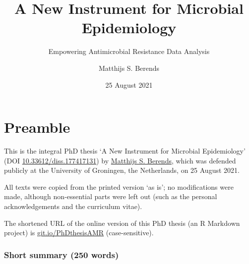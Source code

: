 \documentclass[
]{book}
\title{A New Instrument for Microbial Epidemiology}
\subtitle{Empowering Antimicrobial Resistance Data Analysis}
\author{Matthijs S. Berends}
\date{25 August 2021}
\begin{document}
\maketitle

{
\setcounter{tocdepth}{1}
\tableofcontents
}
\hypertarget{preamble}{%
\chapter*{Preamble}\label{preamble}}

This is the integral PhD thesis `A New Instrument for Microbial Epidemiology' (DOI \href{https://doi.org/10.33612/diss.177417131}{10.33612/diss.177417131}) by \href{https://www.rug.nl/staff/m.s.berends}{Matthijs S. Berends}, which was defended publicly at the University of Groningen, the Netherlands, on 25 August 2021.

All texts were copied from the printed version `as is'; no modifications were made, although non-essential parts were left out (such as the personal acknowledgements and the curriculum vitae).

The shortened URL of the online version of this PhD thesis (an R Markdown project) is \href{https://git.io/PhDthesisAMR}{git.io/PhDthesisAMR} (case-sensitive).

\hypertarget{short-summary-250-words}{%
\subsection*{Short summary (250 words)}\label{short-summary-250-words}}
\end{document}
